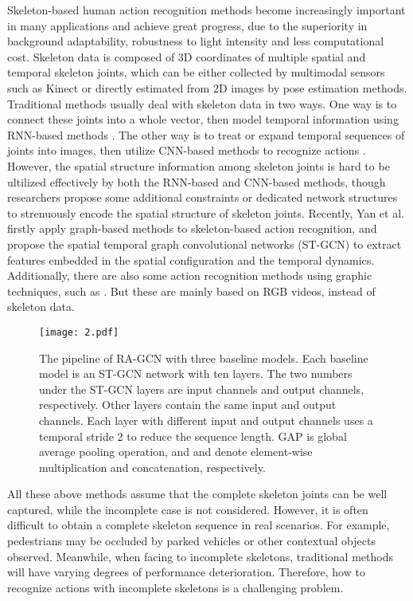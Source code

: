 \documentclass{article}
\begin{document}
Skeleton-based human action recognition methods become increasingly important in many applications and achieve great progress, due to the superiority in background adaptability, robustness to light intensity and less computational cost. Skeleton data is composed of 3D coordinates of multiple spatial and temporal skeleton joints, which can be either collected by multimodal sensors such as Kinect or directly estimated from 2D images by pose estimation methods. Traditional methods usually deal with skeleton data in two ways. One way is to connect these joints into a whole vector, then model temporal information using RNN-based methods \cite{Liu2016, Zhang2017, Zhang2017b, Wang2017, Si2018}. The other way is to treat or expand temporal sequences of joints into images, then utilize CNN-based methods to recognize actions \cite{Li2017b, Kim2017, Ding2017, Li2018, Tang2018}. However, the spatial structure information among skeleton joints is hard to be ultilized effectively by both the RNN-based and CNN-based methods, though researchers propose some additional constraints or dedicated network structures to strenuously encode the spatial structure of skeleton joints. Recently, Yan et al.\cite{Yan2018} firstly apply graph-based methods to skeleton-based action recognition, and propose the spatial temporal graph convolutional networks (ST-GCN) to extract features embedded in the spatial configuration and the temporal dynamics. Additionally, there are also some action recognition methods using graphic techniques, such as \cite{Wang2013, Wang2014a, Wang2014b}. But these are mainly based on RGB videos, instead of skeleton data.

\begin{figure*}[t]
\label{fig:2}
\centerline{\texttt{[image: 2.pdf]}}
\caption{The pipeline of RA-GCN with three baseline models. Each baseline model is an ST-GCN network with ten layers. The two numbers under the ST-GCN layers are input channels and output channels, respectively. Other layers contain the same input and output channels. Each layer with different input and output channels uses a temporal stride 2 to reduce the sequence length. GAP is global average pooling operation, and  and  denote element-wise multiplication and concatenation, respectively.}
\vspace{-0.2cm}
\end{figure*}

All these above methods assume that the complete skeleton joints can be well captured, while the incomplete case is not considered. However, it is often difficult to obtain a complete skeleton sequence in real scenarios. For example, pedestrians may be occluded by parked vehicles or other contextual objects observed. Meanwhile, when facing to incomplete skeletons, traditional methods will have varying degrees of performance deterioration. Therefore, how to recognize actions with incomplete skeletons is a challenging problem.
\end{document}
